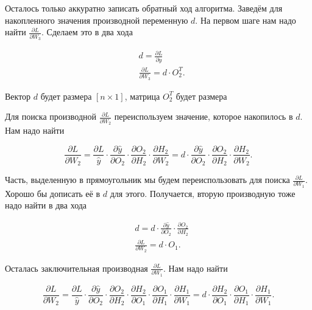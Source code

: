 \begin{sol}
Осталось только аккуратно записать обратный ход алгоритма. Заведём для накопленного значения производной переменную $d$. На первом шаге нам надо найти $\frac{\partial L}{\partial W_3}$. Сделаем это в два хода

\begin{equation*} 
	\begin{aligned}
		&  d = \frac{\partial L}{\partial \hat y} \\
		&  \frac{\partial L}{\partial W_3} = d \cdot O_2^T.
	\end{aligned}
\end{equation*}

Вектор $d$ будет размера $[n \times 1]$, матрица $O_2^T$ будет размера 



Для поиска производной $\frac{\partial L}{\partial W_2}$ переиспользуем значение, которое накопилось в $d$. Нам надо найти 

\[
\frac{\partial L}{\partial W_2} = \frac{\partial L}{\hat y} \cdot \frac{\partial \hat y}{\partial O_2} \cdot \frac{\partial O_2}{\partial H_2} \cdot \frac{\partial H_2}{\partial W_2} = d \cdot \boxed{ \frac{\partial \hat y}{\partial O_2} \cdot \frac{\partial O_2}{\partial H_2} } \cdot \frac{\partial H_2}{\partial W_2}.
\]

Часть, выделенную в прямоугольник мы будем переиспользовать для поиска $\frac{\partial L}{\partial W_1}$. Хорошо бы дописать её в $d$ для этого. Получается, вторую производную тоже надо найти в два хода

\begin{equation*} 
	\begin{aligned}
		&  d = d \cdot \frac{\partial \hat y}{\partial O_2} \cdot \frac{\partial O_2}{\partial H_2} \\
		&  \frac{\partial L}{\partial W_2} = d \cdot O_1.
	\end{aligned}
\end{equation*}

Осталась заключительная производная $\frac{\partial L}{\partial W_1}$. Нам надо найти 

\[
\frac{\partial L}{\partial W_2} = \frac{\partial L}{\hat y} \cdot \frac{\partial \hat y}{\partial O_2} \cdot \frac{\partial O_2}{\partial H_2} \cdot \frac{\partial H_2}{\partial O_1} \cdot \frac{\partial O_1}{\partial H_1}  \cdot \frac{\partial H_1}{\partial W_1}  = d \cdot \frac{\partial H_2}{\partial O_1} \cdot \frac{\partial O_1}{\partial H_1}  \cdot \frac{\partial H_1}{\partial W_1}.
\]


\end{sol}

